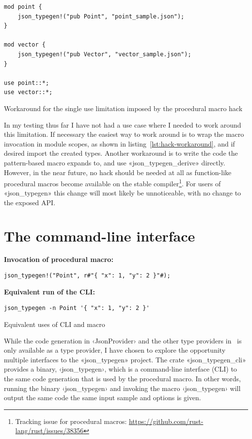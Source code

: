 \begin{listing}[ht!]
\begin{verbatim}
mod point {
    json_typegen!("pub Point", "point_sample.json");
}

mod vector {
    json_typegen!("pub Vector", "vector_sample.json");
}

use point::*;
use vector::*;
\end{verbatim}
\caption{Workaround for the single use limitation imposed by the procedural macro hack}
\label{lst:hack-workaround}
\end{listing}

In my testing thus far I have not had a use case where I needed to work around this limitation. If necessary the easiest way to work around is to wrap the macro invocation in module scopes, as shown in listing~\ref{lst:hack-workaround}, and if desired import the created types. Another workaround is to write the code the pattern-based macro expands to, and use «json_typegen_derive» directly. However, in the near future, no hack should be needed at all as function-like procedural macros become available on the stable compiler\footnote{Tracking issue for procedural macros: \url{https://github.com/rust-lang/rust/issues/38356}}. For users of «json_typegen» this change will most likely be unnoticeable, with no change to the exposed API.

\section{The command-line interface}

\begin{listing}[ht!]
\textbf{Invocation of procedural macro:}
\begin{verbatim}
json_typegen!("Point", r#"{ "x": 1, "y": 2 }"#);
\end{verbatim}
\vspace{5mm}

\textbf{Equivalent run of the CLI:}
\begin{verbatim}
json_typegen -n Point '{ "x": 1, "y": 2 }'
\end{verbatim}
\caption{Equivalent uses of CLI and macro}
\label{lst:cli-and-macro}
\end{listing}

While the code generation in ‹JsonProvider› and the other type providers in \fsharpdata\ is only available as a type provider, I have chosen to explore the opportunity multiple interfaces to the «json_typegen» project. The crate «json_typegen_cli» provides a binary, ‹json_typegen›, which is a command-line interface (CLI) to the same code generation that is used by the procedural macro. In other words, running the binary ‹json_typegen› and invoking the macro ‹json_typegen› will output the same code the same input sample and options is given.

